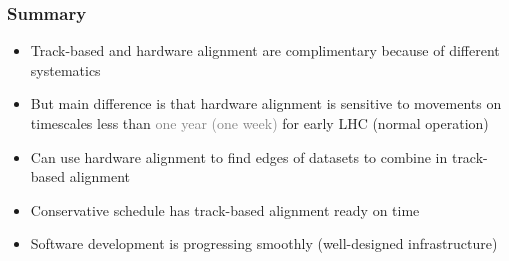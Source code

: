 \documentclass[compress]{beamer}
\begin{document}
\begin{frame}
\frametitle{Summary}

\begin{itemize}\setlength{\itemsep}{0.25 cm}
\item Track-based and hardware alignment are complimentary because of different systematics

\item But main difference is that hardware alignment is sensitive to
movements on timescales less than \textcolor{gray}{one year (one
week)} for early LHC (normal operation)

\item Can use hardware alignment to find edges of datasets to combine
in track-based alignment

\item Conservative schedule has track-based alignment ready on time

\item Software development is progressing smoothly (well-designed
infrastructure)
\end{itemize}

\label{numpages}
\end{frame}
\end{document}
